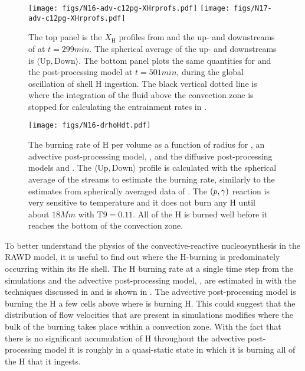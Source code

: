 \documentclass[fleqn,usenatbib]{mnras}
\newcommand{\cldfluid}{fluid above the convection zone}
\newcommand{\ppmstar}{\code{PPMstar}}
\begin{document}
\begin{figure}

  \texttt{[image: figs/N16-adv-c12pg-XHrprofs.pdf]}
  \texttt{[image: figs/N17-adv-c12pg-XHrprofs.pdf]}

  \centering
  \caption{The top panel is the $X_{\mathrm{H}}$ profiles from  and
          the up- and downstreams of  at $t = \unit{299}{min}$. The spherical
          average of the up- and downstreams is $\langle \mathrm{Up}, \mathrm{Down}
          \rangle$. The bottom panel plots the same quantities for  and the
          post-processing model  at $t = \unit{501}{min}$, during the global oscillation of shell H ingestion. The
          black vertical dotted line is where the integration of the \cldfluid{} is
          stopped for calculating the entrainment rates in .
        }
  \label{fig:advectionprofiles}

\end{figure}

\begin{figure}

  \texttt{[image: figs/N16-drhoHdt.pdf]}
  \centering
  \caption{The burning rate of H per volume as a function of radius
    for , an advective post-processing model, , and the 
    diffusive post-processing models  and . The $\langle
    \mathrm{Up}, \mathrm{Down} \rangle$ profile is calculated with the
    spherical average of the streams to estimate the burning rate,
    similarly to the estimates from spherically averaged data of
    \ppmstar{}. The $(p,\gamma)$
    reaction is very sensitive to temperature and it does not burn any
    H until about $\unit{18}{Mm}$ with $\mathrm{T9} = 0.11$. All of
    the H is burned well before it reaches the bottom of the
    convection zone.}
  \label{fig:burningrate}

\end{figure}

To better understand the physics of the convective-reactive nucleosynthesis in the RAWD model, 
it is useful to find out where the H-burning is
predominately occurring within its He shell. The H burning
rate at a single time step from the \ppmstar{} simulations and the advective
post-processing model, , are estimated in  with the
techniques discussed in  and is shown in .
The advective post-processing model is burning the H a few cells above where
 is burning H. This could suggest that the distribution of flow
velocities that are present in \ppmstar{} simulations modifies where the bulk of
the burning takes place within a convection zone. With the fact that there is no
significant accumulation of H throughout the advective post-processing model it
is roughly in a quasi-static state in which it is burning all of the H that it ingests.
\end{document}
